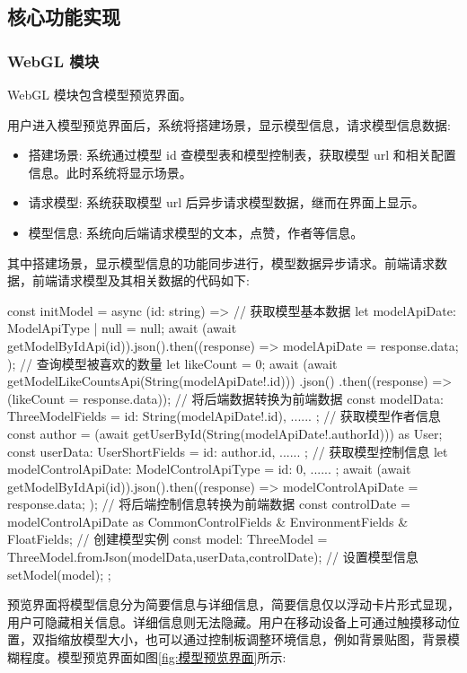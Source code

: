 \subsection{核心功能实现}
\subsubsection{WebGL 模块}

WebGL 模块包含模型预览界面。

用户进入模型预览界面后，系统将搭建场景，显示模型信息，请求模型信息数据:
\begin{itemize}
  \item 搭建场景: 系统通过模型 id 查模型表和模型控制表，获取模型 url 和相关配置信息。此时系统将显示场景。
  \item 请求模型: 系统获取模型 url 后异步请求模型数据，继而在界面上显示。
  \item 模型信息: 系统向后端请求模型的文本，点赞，作者等信息。
\end{itemize}

其中搭建场景，显示模型信息的功能同步进行，模型数据异步请求。前端请求数据，前端请求模型及其相关数据的代码如下:

\begin{JavaScript}
const initModel = async (id: string) => {
  // 获取模型基本数据
  let modelApiDate: ModelApiType | null = null;
  await (await getModelByIdApi(id)).json().then((response) => {
    modelApiDate = response.data;
  });
  // 查询模型被喜欢的数量
  let likeCount = 0;
  await (await getModelLikeCountsApi(String(modelApiDate!.id)))
    .json()
    .then((response) => (likeCount = response.data));
  // 将后端数据转换为前端数据
  const modelData: ThreeModelFields = {
    id: String(modelApiDate!.id),
    ......
  };
  // 获取模型作者信息
  const author = (await getUserById(String(modelApiDate!.authorId))) as User;
  const userData: UserShortFields = {
    id: author.id,
    ......
  };
  // 获取模型控制信息
  let modelControlApiDate: ModelControlApiType = {
    id: 0,
    ......
  };
  await (await getModelByIdApi(id)).json().then((response) => {
    modelControlApiDate = response.data;
  });
  // 将后端控制信息转换为前端数据
  const controlDate = modelControlApiDate as CommonControlFields &
    EnvironmentFields & FloatFields;
  // 创建模型实例
  const model: ThreeModel = ThreeModel.fromJson(modelData,userData,controlDate);
  // 设置模型信息
  setModel(model);
};
\end{JavaScript}


预览界面将模型信息分为简要信息与详细信息，简要信息仅以浮动卡片形式显现，用户可隐藏相关信息。详细信息则无法隐藏。用户在移动设备上可通过触摸移动位置，双指缩放模型大小，也可以通过控制板调整环境信息，例如背景贴图，背景模糊程度。模型预览界面如图\ref{fig:模型预览界面}所示:

